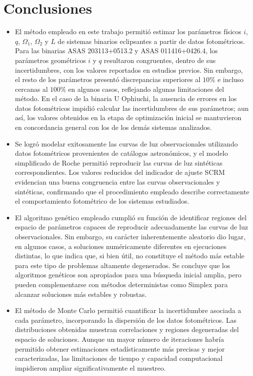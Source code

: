 \chapter{Conclusiones}

\begin{itemize}
   \item El método empleado en este trabajo permitió estimar los parámetros físicos $i$, $q$, $\Omega_{1}$, $\Omega_{2}$ y $L$ de sistemas binarios eclipsantes a partir de datos fotométricos. Para las binarias ASAS 203113+0513.2 y ASAS 011416+0426.4, los parámetros geométricos $i$ y $q$ resultaron congruentes, dentro de sus incertidumbres, con los valores reportados en estudios previos. Sin embargo, el resto de los parámetros presentó discrepancias superiores al $10\%$ e incluso cercanas al $100\%$ en algunos casos, reflejando algunas limitaciones del método. En el caso de la binaria U Ophiuchi, la ausencia de errores en los datos fotométricos impidió calcular las incertidumbres de sus parámetros; aun así, los valores obtenidos en la etapa de optimización inicial se mantuvieron en concordancia general con los de los demás sistemas analizados.

\item Se logró modelar exitosamente las curvas de luz observacionales utilizando datos fotométricos provenientes de catálogos astronómicos, y el modelo simplificado de Roche permitió reproducir las curvas de luz sintéticas correspondientes. Los valores reducidos del indicador de ajuste SCRM evidencian una buena congruencia entre las curvas observacionales y sintéticas, confirmando que el procedimiento empleado describe correctamente el comportamiento fotométrico de los sistemas estudiados.

\item El algoritmo genético empleado cumplió su función de identificar regiones del espacio de parámetros capaces de reproducir adecuadamente las curvas de luz observacionales. Sin embargo, su carácter inherentemente aleatorio dio lugar, en algunos casos, a soluciones numéricamente diferentes en ejecuciones distintas, lo que indica que, si bien útil, no constituye el método más estable para este tipo de problemas altamente degenerados. Se concluye que los algoritmos genéticos son apropiados para una búsqueda inicial amplia, pero pueden complementarse con métodos deterministas como Simplex para alcanzar soluciones más estables y robustas.

\item El método de Monte Carlo permitió cuantificar la incertidumbre asociada a cada parámetro, incorporando la dispersión de los datos fotométricos. Las distribuciones obtenidas muestran correlaciones y regiones degeneradas del espacio de soluciones. Aunque un mayor número de iteraciones habría permitido obtener estimaciones estadísticamente más precisas y mejor caracterizadas, las limitaciones de tiempo y capacidad computacional impidieron ampliar significativamente el muestreo.


\end{itemize}
